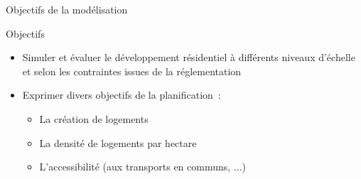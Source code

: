 \documentclass[xcolor=table]{beamer}
\begin{document}
\begin{frame}{Objectifs de la modélisation}
  \begin{block}{Objectifs}
	\begin{itemize}
	\vspace{-0.2cm}
		\small
		\item<1-> Simuler et évaluer le développement résidentiel à différents niveaux d'échelle et selon les contraintes issues de la réglementation

		\item<2-> Exprimer divers objectifs de la planification~: %
		\begin{itemize}
			\scriptsize
			\item<3-> La création de logements
			\item<4-> La densité de logements par hectare
			\item<5-> L'accessibilité (aux transports en communs, ...)
		\end{itemize}
		\end{itemize}
	\end{block}
	\vspace{-0.5cm}
	\vspace{-0.5cm}
\end{frame}
\end{document}
